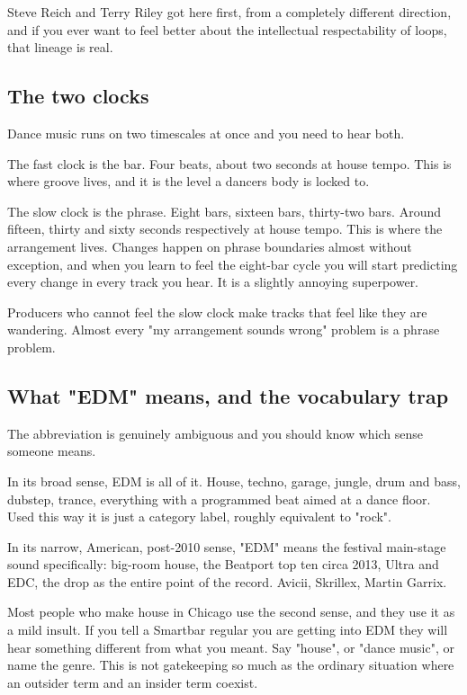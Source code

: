 Steve Reich and Terry Riley got here first, from a completely different direction, and if
you ever want to feel better about the intellectual respectability of loops, that lineage
is real.

\subsection{The two clocks}\label{th01_what_edm_is-the-two-clocks}

Dance music runs on two timescales at once and you need to hear both.

The fast clock is the bar. Four beats, about two seconds at house tempo. This is where
groove lives, and it is the level a dancer\textquotesingle s body is locked to.

The slow clock is the phrase. Eight bars, sixteen bars, thirty-two bars. Around fifteen,
thirty and sixty seconds respectively at house tempo. This is where the arrangement lives.
Changes happen on phrase boundaries almost without exception, and when you learn to feel
the eight-bar cycle you will start predicting every change in every track you hear. It is a
slightly annoying superpower.

Producers who cannot feel the slow clock make tracks that feel like they are wandering.
Almost every "my arrangement sounds wrong" problem is a phrase problem.

\subsection{What "EDM" means, and the vocabulary trap}\label{th01_what_edm_is-what-edm-means-and-the-vocabulary-trap}

The abbreviation is genuinely ambiguous and you should know which sense someone means.

In its broad sense, EDM is all of it. House, techno, garage, jungle, drum and bass,
dubstep, trance, everything with a programmed beat aimed at a dance floor. Used this way it
is just a category label, roughly equivalent to "rock".

In its narrow, American, post-2010 sense, "EDM" means the festival main-stage sound
specifically: big-room house, the Beatport top ten circa 2013, Ultra and EDC, the drop as
the entire point of the record. Avicii, Skrillex, Martin Garrix.

Most people who make house in Chicago use the second sense, and they use it as a mild
insult. If you tell a Smartbar regular you are getting into EDM they will hear something
different from what you meant. Say "house", or "dance music", or name the genre. This is
not gatekeeping so much as the ordinary situation where an outsider term and an insider
term coexist.

